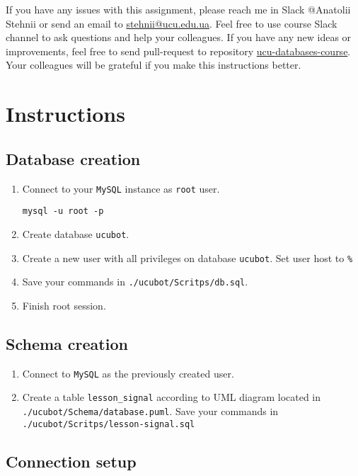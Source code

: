 \documentclass[12pt]{article}
\newcommand{\code}[1]{\texttt{#1}}
\begin{document}
If you have any issues with this assignment, please reach me in Slack @Anatolii Stehnii or send an email to \href{mailto:stehnii@ucu.edu.ua}{stehnii@ucu.edu.ua}. Feel free to use course Slack channel to ask questions and help your colleagues. If you have any new ideas or improvements, feel free to send pull-request to repository \href{https://github.com/tsdaemon/ucu-databases-course}{ucu-databases-course}. Your colleagues will be grateful if you make this instructions better.

\section*{Instructions}
\subsection*{Database creation}

\begin{enumerate}
\item Connect to your \code{MySQL} instance as \code{root} user.
\begin{verbatim}
mysql -u root -p
\end{verbatim}
\item Create database \code{ucubot}.
\item Create a new user with all privileges on database \code{ucubot}. Set user host to \code{\%}
\item Save your commands in \code{./ucubot/Scritps/db.sql}.
\item Finish root session.
\end{enumerate}

\subsection*{Schema creation}

\begin{enumerate}
\item Connect to \code{MySQL} as the previously created user.
\item Create a table \code{lesson\_signal} according to UML diagram located in \break \code{./ucubot/Schema/database.puml}. Save your commands in \break \code{./ucubot/Scritps/lesson-signal.sql}
\end{enumerate}

\subsection*{Connection setup}
\end{document}
